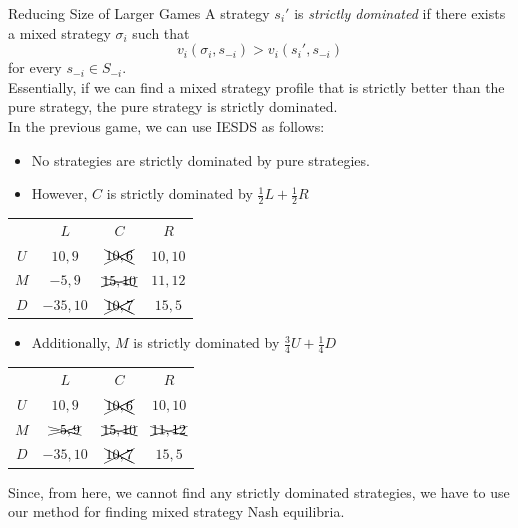 \documentclass[8pt]{extarticle}
\begin{document}
  \begin{problem}{Reducing Size of Larger Games}
    A strategy $s_i'$ is \textit{strictly dominated} if there exists a mixed strategy $\sigma_i$ such that
    \[
      v_i(\sigma_i,s_{-i}) > v_i(s_i',s_{-i})
    \] 
    for every $s_{-i}\in S_{-i}$.\\

    Essentially, if we can find a mixed strategy profile that is strictly better than the pure strategy, the pure strategy is strictly dominated.\\

    In the previous game, we can use IESDS as follows:
    \begin{itemize}
      \item No strategies are strictly dominated by pure strategies.
      \item However, $C$ is strictly dominated by $\frac{1}{2}L + \frac{1}{2}R$
    \end{itemize}
    \begin{center}
      \renewcommand{\arraystretch}{1.5}
      \begin{tabular}{c|c|c|c|}
        \multicolumn{1}{c}{} & \multicolumn{1}{c}{$L$} & \multicolumn{1}{c}{$C$} & \multicolumn{1}{c}{$R$}\\
        \cline{2-4}
        $U$ & $10,9$ & $\xcancel{10,6}$ & $10,10$ \\
        \cline{2-4}
        $M$ & $-5,9$ & $\xcancel{15,10}$ & $11,12$\\
        \cline{2-4}
        $D$ & $-35,10$ & $\xcancel{10,7}$ & $15,5$\\
        \cline{2-4}
      \end{tabular}
    \end{center}
    \begin{itemize}
      \item Additionally, $M$ is strictly dominated by $\frac{3}{4}U + \frac{1}{4}D$
    \end{itemize}
    \begin{center}
      \renewcommand{\arraystretch}{1.5}
      \begin{tabular}{c|c|c|c|}
        \multicolumn{1}{c}{} & \multicolumn{1}{c}{$L$} & \multicolumn{1}{c}{$C$} & \multicolumn{1}{c}{$R$}\\
        \cline{2-4}
        $U$ & $10,9$ & $\xcancel{10,6}$ & $10,10$ \\
        \cline{2-4}
        $M$ & $\xcancel{-5,9}$ & $\xcancel{15,10}$ & $\xcancel{11,12}$\\
        \cline{2-4}
        $D$ & $-35,10$ & $\xcancel{10,7}$ & $15,5$\\
        \cline{2-4}
      \end{tabular}
    \end{center}
    Since, from here, we cannot find any strictly dominated strategies, we have to use our method for finding mixed strategy Nash equilibria.\\


\end{problem}
\end{document}
